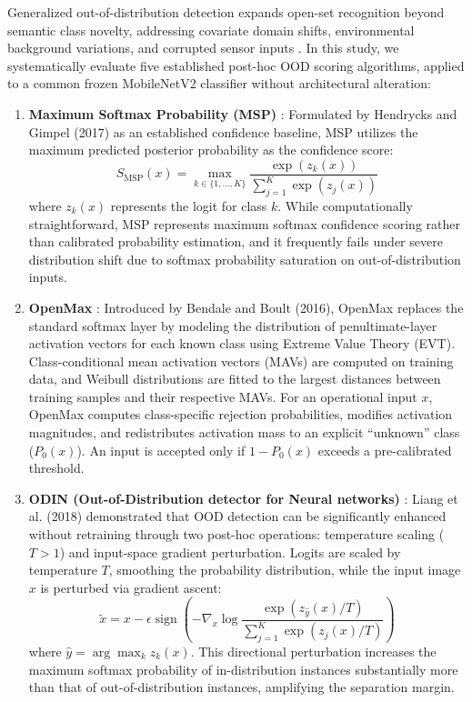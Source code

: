 Generalized out-of-distribution detection expands open-set recognition beyond semantic class novelty, addressing covariate domain shifts, environmental background variations, and corrupted sensor inputs \cite{yang2024generalized}. In this study, we systematically evaluate five established post-hoc OOD scoring algorithms, applied to a common frozen MobileNetV2 classifier without architectural alteration:

\begin{enumerate}
\item \textbf{Maximum Softmax Probability (MSP)} \cite{hendrycks2017baseline}: Formulated by Hendrycks and Gimpel (2017) as an established confidence baseline, MSP utilizes the maximum predicted posterior probability as the confidence score:
\begin{equation}
S_{\text{MSP}}(x) = \max_{k \in \{1,\dots,K\}} \frac{\exp(z_k(x))}{\sum_{j=1}^K \exp(z_j(x))}
\label{eq:msp}
\end{equation}
where $z_k(x)$ represents the logit for class $k$. While computationally straightforward, MSP represents maximum softmax confidence scoring rather than calibrated probability estimation, and it frequently fails under severe distribution shift due to softmax probability saturation on out-of-distribution inputs.

\item \textbf{OpenMax} \cite{bendale2016towards}: Introduced by Bendale and Boult (2016), OpenMax replaces the standard softmax layer by modeling the distribution of penultimate-layer activation vectors for each known class using Extreme Value Theory (EVT). Class-conditional mean activation vectors (MAVs) are computed on training data, and Weibull distributions are fitted to the largest distances between training samples and their respective MAVs. For an operational input $x$, OpenMax computes class-specific rejection probabilities, modifies activation magnitudes, and redistributes activation mass to an explicit ``unknown'' class ($P_0(x)$). An input is accepted only if $1 - P_0(x)$ exceeds a pre-calibrated threshold.

\item \textbf{ODIN (Out-of-Distribution detector for Neural networks)} \cite{liang2018enhancing}: Liang et al. (2018) demonstrated that OOD detection can be significantly enhanced without retraining through two post-hoc operations: temperature scaling ($T > 1$) and input-space gradient perturbation. Logits are scaled by temperature $T$, smoothing the probability distribution, while the input image $x$ is perturbed via gradient ascent:
\begin{equation}
\tilde{x} = x - \epsilon \operatorname{sign}\left(-\nabla_x \log \frac{\exp(z_{\hat{y}}(x)/T)}{\sum_{j=1}^K \exp(z_j(x)/T)}\right)
\label{eq:odin}
\end{equation}
where $\hat{y} = \arg\max_k z_k(x)$. This directional perturbation increases the maximum softmax probability of in-distribution instances substantially more than that of out-of-distribution instances, amplifying the separation margin.


\end{enumerate}
